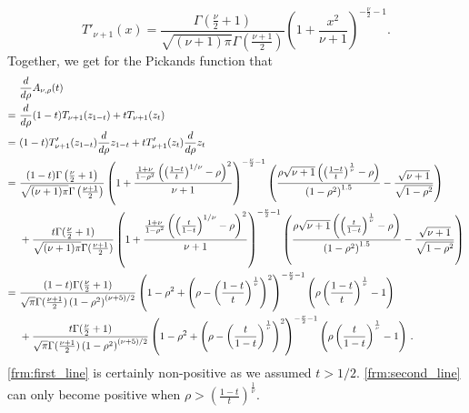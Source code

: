 \documentclass{article}
\begin{document}
\begin{itemize}
    \[
        T'_{\nu + 1}(x)
        = \frac{\Gamma\left(\frac{\nu}{2} + 1\right)}{\sqrt{(\nu + 1) \pi} \Gamma\left(\frac{\nu + 1}{2}\right)}\left(1+\frac{x^2}{\nu + 1}\right)^{-\frac{\nu}{2} - 1}
    .\]
    Together, we get for the Pickands function that
    \small
    \begin{align}
        & \frac{d}{d\rho} A_{\nu, \rho}(t) \nonumber\allowdisplaybreaks\\
        = ~ & \frac{d}{d\rho}(1-t)T_{\nu + 1}(z_{1-t}) + t T_{\nu + 1}(z_t) \nonumber\allowdisplaybreaks\\
        = ~ & (1-t)T'_{\nu + 1}(z_{1-t})\frac{d}{d\rho} z_{1-t} + tT'_{\nu + 1}(z_t)\frac{d}{d\rho} z_t \nonumber\allowdisplaybreaks\\
        = ~ & \frac{(1-t)\Gamma\left(\frac{\nu}{2} + 1\right)}{\sqrt{(\nu + 1) \pi} \Gamma\left(\frac{\nu + 1}{2}\right)}\left(1+\frac{\frac{1+\nu}{1-\rho^2}\left(\left(\frac{1-t}{t}\right)^{1/\nu}-\rho\right)^2}{\nu + 1}\right)^{-\frac{\nu}{2} - 1}\left(\frac{\rho \sqrt{\nu + 1} \left(\left(\frac{1-t}{t}\right)^{\frac{1}{\nu}}- \rho\right)}{\left(1 - \rho^{2}\right)^{1.5}} - \frac{\sqrt{\nu + 1}}{\sqrt{1-\rho^2}}\right) \nonumber\allowdisplaybreaks\\
        & + \frac{t\Gamma(\frac{\nu}{2} + 1)}{\sqrt{(\nu + 1) \pi} \Gamma(\frac{\nu + 1}{2})}\left(1+\frac{\frac{1+\nu}{1-\rho^2}\left(\left(\frac{t}{1-t}\right)^{1/\nu}-\rho\right)^2}{\nu + 1}\right)^{-\frac{\nu}{2} - 1}\left(\frac{\rho \sqrt{\nu + 1} \left(\left(\frac{t}{1 - t}\right)^{\frac{1}{\nu}}- \rho\right)}{\left(1 - \rho^{2}\right)^{1.5}} - \frac{\sqrt{\nu + 1}}{\sqrt{1-\rho^2}}\right) \nonumber\allowdisplaybreaks\\
        = ~ & \frac{(1-t)\Gamma(\frac{\nu}{2} + 1)}{\sqrt{\pi} \Gamma(\frac{\nu + 1}{2})\left(1-\rho^2\right)^{(\nu+5)/2}}\left(1 - \rho^2 + \left(\rho - \left(\frac{1-t}{t}\right)^{\frac{1}{\nu}}\right)^{2}\right)^{-\frac{\nu}{2} - 1}\left(\rho \left(\frac{1-t}{t}\right)^{\frac{1}{\nu}}- 1\right) \label{frm:first_line} \\
        & + \frac{t\Gamma(\frac{\nu}{2} + 1)}{\sqrt{\pi} \Gamma(\frac{\nu + 1}{2})\left(1-\rho^2\right)^{(\nu+5)/2}}\left(1 - \rho^2 + \left(\rho - \left(\frac{t}{1-t}\right)^{\frac{1}{\nu}}\right)^{2}\right)^{-\frac{\nu}{2} - 1}\left(\rho \left(\frac{t}{1 - t}\right)^{\frac{1}{\nu}}- 1\right)\,.\label{frm:second_line}
    \end{align}
    \normalsize
    \eqref{frm:first_line} is certainly non-positive as we assumed $t>1/2$.
    \eqref{frm:second_line} can only become positive when $\rho > \left(\frac{1-t}{t}\right)^{\frac{1}{\nu}}$.

\end{itemize}
\end{document}
